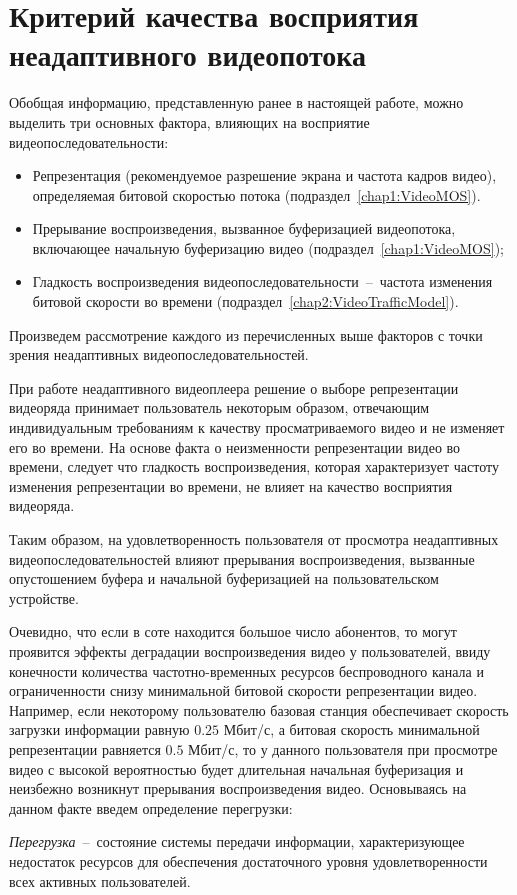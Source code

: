 \section{Критерий качества восприятия неадаптивного видеопотока}
\label{chap3:NonAdaptiveQoe}
Обобщая информацию, представленную ранее в настоящей работе, можно выделить три основных фактора, влияющих на восприятие видеопоследовательности:
\begin{itemize}
	\item Репрезентация (рекомендуемое разрешение экрана и частота кадров видео), определяемая битовой скоростью потока (подраздел~\ref{chap1:VideoMOS}).
	\item Прерывание воспроизведения, вызванное буферизацией видеопотока, включающее начальную буферизацию видео (подраздел~\ref{chap1:VideoMOS});
	\item Гладкость воспроизведения видеопоследовательности~--~частота изменения битовой скорости во времени (подраздел~\ref{chap2:VideoTrafficModel}).
\end{itemize}
Произведем рассмотрение каждого из перечисленных выше факторов с точки зрения неадаптивных видеопоследовательностей.

При работе неадаптивного видеоплеера решение о выборе репрезентации видеоряда принимает пользователь некоторым образом, отвечающим индивидуальным требованиям к качеству просматриваемого видео и не изменяет его во времени. На основе факта о неизменности репрезентации видео во времени, следует что гладкость воспроизведения, которая характеризует частоту изменения репрезентации во времени, не влияет на качество восприятия видеоряда.

Таким образом, на удовлетворенность пользователя от просмотра неадаптивных видеопоследовательностей влияют прерывания воспроизведения, вызванные опустошением буфера и начальной буферизацией на пользовательском устройстве.

Очевидно, что если в соте находится большое число абонентов, то могут проявится эффекты деградации воспроизведения видео у пользователей, ввиду конечности количества частотно-временных ресурсов беспроводного канала и ограниченности снизу минимальной битовой скорости репрезентации видео. Например, если некоторому пользователю базовая станция обеспечивает скорость загрузки информации равную $0.25$ Мбит/с, а битовая скорость минимальной репрезентации равняется $0.5$ Мбит/с, то у данного пользователя при просмотре видео с высокой вероятностью будет длительная начальная буферизация и неизбежно возникнут прерывания воспроизведения видео. Основываясь на данном факте введем определение перегрузки:
\begin{definition}
\label{def:Congestion}
    \emph{Перегрузка}~--~состояние системы передачи информации, характеризующее недостаток ресурсов для обеспечения достаточного уровня удовлетворенности всех активных пользователей.
\end{definition}

